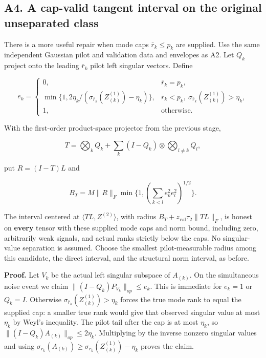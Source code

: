 \subsection{A4. A cap-valid tangent interval on the original unseparated
class}\label{a4.-a-cap-valid-tangent-interval-on-the-original-unseparated-class}\label{sup:A4}

There is a more useful repair when mode caps \(\bar r_k\le p_k\) are
supplied. Use the same independent Gaussian pilot and validation data
and envelopes as A2. Let \(Q_k\) project onto the leading \(\bar r_k\)
pilot left singular vectors. Define

\[e_k=\begin{cases}
0,&\bar r_k=p_k,\\
\min\{1,2\eta_k/(\sigma_{\bar r_k}(Z^{(1)}_{(k)})-\eta_k)\},
&\bar r_k<p_k,\ \sigma_{\bar r_k}(Z^{(1)}_{(k)})>\eta_k,\\
1,&\text{otherwise}.
\end{cases}\]

With the first-order product-space projector from the previous stage,

\[T=\bigotimes_k Q_k+\sum_k(I-Q_k)\otimes\bigotimes_{l\ne k}Q_l,\]

put \(R=(I-T)L\) and

\[B_T=M\|R\|_F\min\{1,(\sum_{k<l}e_k^2e_l^2)^{1/2}\}.\]

The interval centered at \(\langle TL,Z^{(2)}\rangle\), with radius
\(B_T+z_{\mathrm{val}}\tau_2\|TL\|_F\), is honest on \textbf{every}
tensor with these supplied mode caps and norm bound, including zero,
arbitrarily weak signals, and actual ranks strictly below the caps. No
singular-value separation is assumed. Choose the smallest
pilot-measurable radius among this candidate, the direct interval, and
the structural norm interval, as before.

\textbf{Proof.} Let \(V_k\) be the actual left singular subspace of
\(A_{(k)}\). On the simultaneous noise event we claim
\(\|(I-Q_k)P_{V_k}\|_{op}\le e_k\). This is immediate for \(e_k=1\) or
\(Q_k=I\). Otherwise \(\sigma_{\bar r_k}(Z^{(1)}_{(k)})>\eta_k\) forces
the true mode rank to equal the supplied cap: a smaller true rank would
give that observed singular value at most \(\eta_k\) by Weyl's
inequality. The pilot tail after the cap is at most \(\eta_k\), so
\(\|(I-Q_k)A_{(k)}\|_{op}\le2\eta_k\). Multiplying by the inverse
nonzero singular values and using \(\sigma_{\bar r_k}(A_{(k)})\ge
\sigma_{\bar r_k}(Z^{(1)}_{(k)})-\eta_k\) proves the claim.


